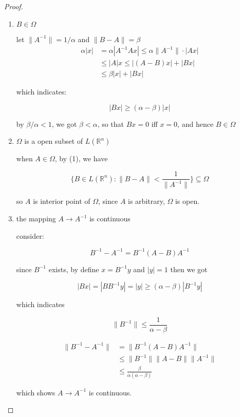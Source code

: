 \begin{proof}
   \begin{enumerate}
    \item $B \in \Omega$

    let $\| A^{-1} \| = 1/\alpha$ and $\| B - A \| = \beta$
    \begin{align*}
        \alpha |x| &= \alpha |A^{-1}Ax | \le \alpha \| A^{-1}\| \cdot |Ax| \\
        & \le |A| x \le |(A-B)x| + |Bx| \\
        & \le \beta |x| + |Bx|
    \end{align*}

    which indicates:

    \[
        |Bx| \ge (\alpha - \beta)|x|
    \]

    by $\beta / \alpha < 1$, we got $\beta < \alpha$, so that $Bx = 0$ iff $x = 0$, and hence $B \in \Omega$

    \item $\Omega$ is a open subset of $L(\mathbb{R}^n)$

    when $A \in \Omega$, by (1), we have

    \[
        \{ B \in L(\mathbb{R}^n): \| B - A\| < \frac{1}{\| A^{-1}\|} \} \subseteq \Omega
    \]
    
    so $A$ is interior point of $\Omega$, since $A$ is arbitrary, $\Omega$ is open.


    \item the mapping $A \to A^{-1}$ is continuous

    consider:

    \[
        B^{-1} - A^{-1} = B^{-1}(A-B)A^{-1}
    \]

    since $B^{-1}$ exists,  by define $x = B^{-1}y$ and $|y| = 1$ then we got

    \[
        |Bx| = |BB^{-1}y|= |y| \ge (\alpha - \beta) | B^{-1} y|
    \]

    which indicates

    \[
        \| B^{-1}\| \le \frac{1}{\alpha - \beta}
    \]
    
    \begin{align*}
       \| B^{-1} - A^{-1} \|  &= \| B^{-1}(A - B) A^{-1}\| \\
       & \le  \| B^{-1} \| \| A - B \| \| A^{-1} \| \\
       & \le \frac{\beta}{\alpha(\alpha - \beta)} 
    \end{align*}

    which shows $A \to A^{-1}$ is continuous.
   \end{enumerate}
\end{proof}

